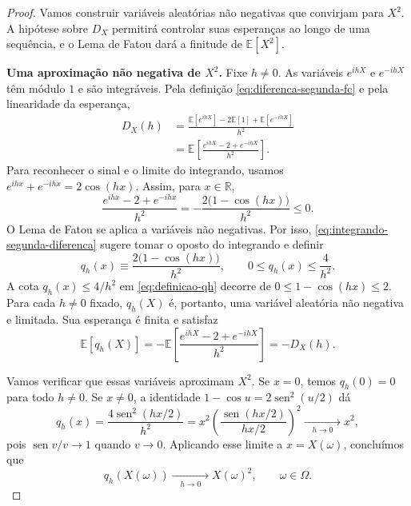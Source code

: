 \documentclass[12pt,portuguese]{article}
\theoremstyle{definition}
\theoremstyle{plainexercise}
\theoremstyle{starredexercise}
\theoremstyle{definition}
\renewcommand{\sin}{\operatorname{sen}}
\begin{document}
\begin{proof}
Vamos construir variáveis aleatórias não negativas que convirjam
para $X^2$. A hipótese sobre $D_X$ permitirá controlar suas
esperanças ao longo de uma sequência, e o Lema de Fatou dará
a finitude de $\mathbb{E}[X^2]$.

\smallskip
\noindent\textbf{Uma aproximação não negativa de $X^2$.}
Fixe $h\neq0$. As variáveis $e^{ihX}$ e $e^{-ihX}$ têm módulo $1$
e são integráveis. Pela definição \eqref{eq:diferenca-segunda-fc}
e pela linearidade da esperança,
\begin{align*}
D_X(h)
&=\frac{\mathbb{E}[e^{ihX}]-2\mathbb{E}[1]
+\mathbb{E}[e^{-ihX}]}{h^2}
\\[0.3cm]
&=\mathbb{E}\left[
\frac{e^{ihX}-2+e^{-ihX}}{h^2}
\right].
\end{align*}
Para reconhecer o sinal e o limite do integrando, usamos
$e^{ihx}+e^{-ihx}=2\cos(hx)$. Assim, para $x\in\mathbb{R}$,
\begin{equation}\label{eq:integrando-segunda-diferenca}
\frac{e^{ihx}-2+e^{-ihx}}{h^2}
=-\frac{2\bigl(1-\cos(hx)\bigr)}{h^2}
\leqslant0.
\end{equation}
O Lema de Fatou se aplica a variáveis não negativas. Por isso,
\eqref{eq:integrando-segunda-diferenca} sugere tomar o oposto
do integrando e definir
\begin{equation}\label{eq:definicao-qh}
q_h(x)\equiv
\frac{2\bigl(1-\cos(hx)\bigr)}{h^2},
\qquad 0\leqslant q_h(x)\leqslant\frac{4}{h^2}.
\end{equation}
A cota $q_h(x)\leqslant4/h^2$ em \eqref{eq:definicao-qh}
decorre de $0\leqslant1-\cos(hx)\leqslant2$.
Para cada $h\neq0$ fixado, $q_h(X)$ é, portanto, uma variável
aleatória não negativa e limitada. Sua esperança é finita e satisfaz
\begin{equation}\label{eq:esperanca-qh}
\mathbb{E}[q_h(X)]
=-\mathbb{E}\left[\frac{e^{ihX}-2+e^{-ihX}}{h^2}\right]
=-D_X(h).
\end{equation}

Vamos verificar que essas variáveis aproximam $X^2$.
Se $x=0$, temos $q_h(0)=0$ para todo $h\neq0$.
Se $x\neq0$, a identidade $1-\cos u=2\sin^2(u/2)$ dá
\[
q_h(x)
=\frac{4\sin^2(hx/2)}{h^2}
=x^2\left(\frac{\sin(hx/2)}{hx/2}\right)^2
\xrightarrow[\quad h\to 0\quad]{} x^2,
\]
pois $\sin v/v\to1$ quando $v\to0$.
Aplicando esse limite a $x=X(\omega)$, concluímos que
\begin{equation}\label{eq:limite-qh}
q_h(X(\omega))
\xrightarrow[\quad h\to 0\quad]{}
X(\omega)^2, \qquad \omega\in\Omega.
\end{equation}


\end{proof}
\end{document}

